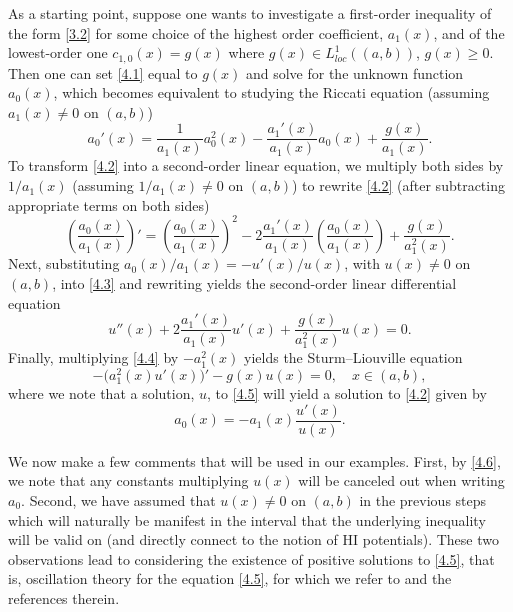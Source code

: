 \documentclass[reqno,10pt,centertags]{amsart}
\numberwithin{equation}{section}
\theoremstyle{remark}
\begin{document}
As a starting point, suppose one wants to investigate a first-order inequality of the form \eqref{3.2} for some choice of the highest order coefficient, $a_1(x)$, and of the lowest-order one $c_{1,0}(x)=g(x)$ where $g(x) \in L^1_{loc}((a,b))$, $g(x)\geq0$. Then one can set \eqref{4.1} equal to $g(x)$ and solve for the unknown function $a_0(x)$, which becomes equivalent to studying the Riccati equation (assuming $a_1(x)\neq0$ on $(a,b)$)
\begin{equation}\label{4.2}
a_0'(x)=\frac{1}{a_1(x)}a_0^2(x)-\frac{a_1'(x)}{a_1(x)}a_0(x)+\frac{g(x)}{a_1(x)}.
\end{equation}
To transform \eqref{4.2} into a second-order linear equation, we multiply both sides by $1/a_1(x)$ (assuming $1/a_1(x)\neq0$ on $(a,b)$) to rewrite \eqref{4.2} (after subtracting appropriate terms on both sides)
\begin{equation}\label{4.3}
\left(\frac{a_0(x)}{a_1(x)}\right)'=\left(\frac{a_0(x)}{a_1(x)}\right)^2-2\frac{a_1'(x)}{a_1(x)}\left(\frac{a_0(x)}{a_1(x)}\right)+\frac{g(x)}{a_1^2(x)}.
\end{equation}
Next, substituting $a_0(x)/a_1(x)=-u'(x)/u(x)$, with $u(x)\neq 0$ on $(a,b)$, into \eqref{4.3} and rewriting yields the second-order linear differential equation
\begin{equation}\label{4.4}
u''(x)+2\frac{a_1'(x)}{a_1(x)}u'(x)+\frac{g(x)}{a_1^2(x)}u(x)=0.
\end{equation}
Finally, multiplying \eqref{4.4} by $-a_1^2(x)$ yields the Sturm--Liouville equation
\begin{equation}\label{4.5}
-\big(a_1^2(x) u'(x)\big)'-g(x)u(x)=0,\quad x\in(a,b),
\end{equation}
where we note that a solution, $u$, to \eqref{4.5} will yield a solution to \eqref{4.2} given by
\begin{equation}\label{4.6}
a_0(x)=-a_1(x)\frac{u'(x)}{u(x)}.
\end{equation}

We now make a few comments that will be used in our examples. First, by \eqref{4.6}, we note that any constants multiplying $u(x)$ will be canceled out when writing $a_0$. Second, we have assumed that $u(x)\neq0$ on $(a,b)$ in the previous steps which will naturally be manifest in the interval that the underlying inequality will be valid on (and directly connect to the notion of HI potentials). These two observations lead to considering the existence of positive solutions to \eqref{4.5}, that is, oscillation theory for the equation \eqref{4.5}, for which we refer to \cite[Ch. 8]{GNZ24} and the references therein.
\end{document}
